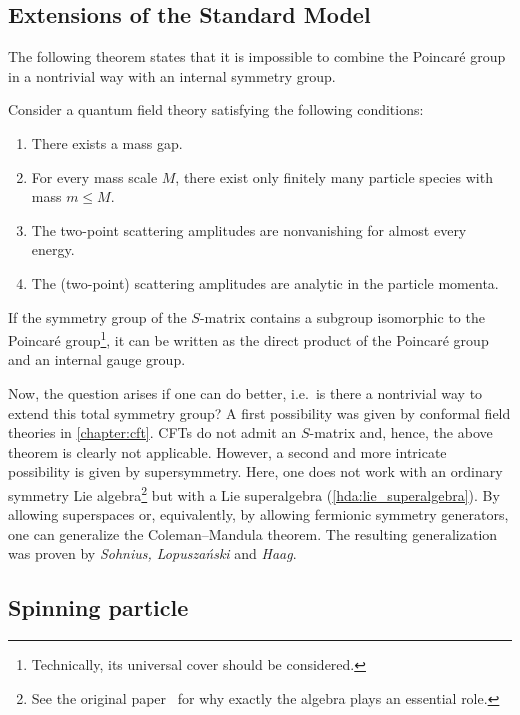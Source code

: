 \subsection{Extensions of the Standard Model}

    The following theorem states that it is impossible to combine the Poincar\'e group in a nontrivial way with an internal symmetry group.
    \begin{theorem}
        Consider a quantum field theory satisfying the following conditions:
        \begin{enumerate}
            \item There exists a mass gap.
            \item For every mass scale $M$, there exist only finitely many particle species with mass $m\leq M$.
            \item The two-point scattering amplitudes are nonvanishing for almost every energy.
            \item The (two-point) scattering amplitudes are analytic in the particle momenta.
        \end{enumerate}
        If the symmetry group of the $S$-matrix contains a subgroup isomorphic to the Poincar\'e group\footnote{Technically, its universal cover should be considered.}, it can be written as the direct product of the Poincar\'e group and an internal gauge group.
    \end{theorem}

    Now, the question arises if one can do better, i.e.~is there a nontrivial way to extend this total symmetry group? A first possibility was given by conformal field theories in \cref{chapter:cft}. CFTs do not admit an $S$-matrix and, hence, the above theorem is clearly not applicable. However, a second and more intricate possibility is given by supersymmetry. Here, one does not work with an ordinary symmetry Lie algebra\footnote{See the original paper~\citet{coleman_all_1967} for why exactly the algebra plays an essential role.} but with a Lie superalgebra (\cref{hda:lie_superalgebra}). By allowing superspaces or, equivalently, by allowing fermionic symmetry generators, one can generalize the Coleman--Mandula theorem. The resulting generalization was proven by \textit{Sohnius, Lopusza\'nski} and \textit{Haag}.

\subsection{Spinning particle}

